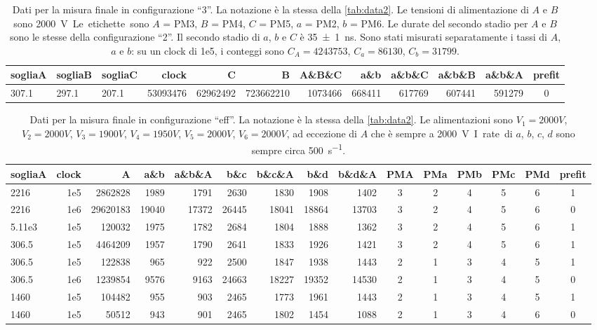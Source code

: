 \begin{table}[p]
	\small
	\hspace{-9em}
	\begin{tabular}{lll|rrrrrrrr|c}
		sogliaA & sogliaB & sogliaC & clock & C & B & A\&B\&C & a\&b & a\&b\&C & a\&b\&B & a\&b\&A & prefit \\
		\hline
		307.1 & 297.1 & 207.1 & 53093476 & 62962492 & 723662210 & 1073466 & 668411 & 617769 & 607441 & 591279 & 0
	\end{tabular}
	\caption{\label{tab:data3}
	Dati per la misura finale in configurazione ``3''.
	La notazione è la stessa della \autoref{tab:data2}.
	Le tensioni di alimentazione di $A$ e $B$ sono \SI{2000}V.
	Le etichette sono $A$ = PM3, $B$ = PM4, $C$ = PM5, $a$ = PM2, $b$ = PM6.
	Le durate del secondo stadio per $A$ e $B$ sono le stesse della configurazione ``2''.
	Il secondo stadio di $a$, $b$ e $C$ è \SI{35\pm1}{ns}.
	Sono stati misurati separatamente i tassi di $A$, $a$ e $b$:
	su un clock di 1e5, i conteggi sono $C_A=4243753$, $C_a=86130$, $C_b=31799$.}
\end{table}

\begin{table}[p]
	\small
	\hspace{-10.5em}
	\begin{tabular}{l|rrrrrrrr|ccccc|c}
		sogliaA & clock & A &a\&b & a\&b\&A & b\&c & b\&c\&A & b\&d & b\&d\&A & PMA & PMa & PMb & PMc & PMd & prefit \\
		\hline\hline
		2216 & 1e5   & 2862828 & 1989 & 1791 & 2630 & 1830 & 1908 & 1402 & 3 & 2 & 4 & 5 & 6 & 1           \\
		2216 & 1e6   & 29620183 & 19040 & 17372 & 26445 & 18041 & 18864 & 13703 & 3 & 2 & 4 & 5 & 6 & 0     \\
		5.11e3 & 1e5 & 120032 & 1975 & 1782 & 2684 & 1804 & 1888 & 1362 & 3 & 2 & 4 & 5 & 6 & 1         \\
		306.5 & 1e5  & 4464209 & 1957 & 1790 & 2641 & 1833 & 1926 & 1421 & 3 & 2 & 4 & 5 & 6 & 1          \\
		\hline
		306.5 & 1e5  & 122838 & 965 & 922 & 2500 & 1847 & 1938 & 1443 & 2 & 1 & 3 & 4 & 5 & 1            \\
		306.5 & 1e6  & 1239854 & 9576 & 9163 & 24663 & 18227 & 19352 & 14530 & 2 & 1 & 3 & 4 & 5 & 0      \\
		1460 & 1e5   & 104482 & 955 & 903 & 2465 & 1773 & 1961 & 1443 & 2 & 1 & 3 & 4 & 5 & 1             \\
		\hline
		1460 & 1e5   & 50512 & 943 & 901 & 2465 & 1802 & 1454 & 1088 & 2 & 1 & 3 & 4 & 6 & 0             
	\end{tabular}
	\caption{\label{tab:dataeff}
	Dati per la misura finale in configurazione ``eff''.
	La notazione è la stessa della \autoref{tab:data2}.
	Le alimentazioni sono
	$V_1=\SI{2000}V$, $V_2=\SI{2000}V$, $V_3=\SI{1900}V$, $V_4=\SI{1950}V$, $V_5=\SI{2000}V$, $V_6=\SI{2000}V$,
	ad eccezione di $A$ che è sempre a \SI{2000}V.
	I~rate di $a$, $b$, $c$, $d$ sono sempre circa \SI{500}{s^{-1}}.}
\end{table}
